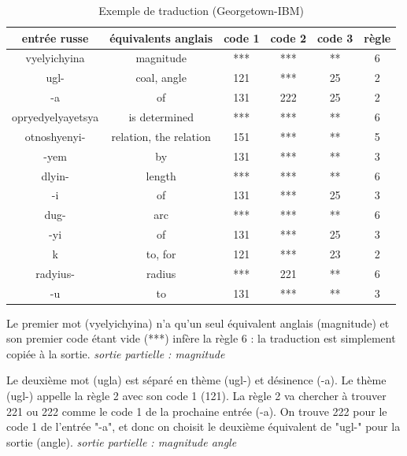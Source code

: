 \documentclass[11pt, a4paper]{report}
\begin{document}
\begin{table}[h] %
  \centering %
  \begin{tabular}{|c|c|c|c|c|c|} %
    \hline %
    entrée russe & équivalents anglais & code 1 & code 2 & code 3 & règle \\ %
    \hline
    vyelyichyina & magnitude & *** & *** & ** & 6 \\
    \hline
    ugl- & coal, angle & 121 & *** & 25 & 2 \\
    \hline 
    -a & of & 131 & 222 & 25 & 2 \\
    \hline 
    opryedyelyayetsya & is determined & *** & *** & ** & 6 \\
    \hline 
    otnoshyenyi- & relation, the relation & 151 & *** & ** & 5 \\ 
    \hline 
    -yem & by & 131 & *** & ** & 3 \\ 
    \hline 
    dlyin- & length & *** & *** & ** & 6 \\ 
    \hline 
    -i & of & 131 & *** & 25 & 3 \\ 
    \hline 
    dug- & arc & *** & *** & ** & 6 \\
    \hline 
    -yi & of & 131 & *** & 25 & 3 \\ 
    \hline 
    k & to, for & 121 & *** & 23 & 2 \\ 
    \hline 
    radyius- & radius & *** & 221 & ** & 6 \\ 
    \hline 
    -u & to & 131 & *** & ** & 3 \\
    \hline
  \end{tabular}
  \caption{Exemple de traduction (Georgetown-IBM)} %
  \label{tab:example} %
\end{table}

Le premier mot (vyelyichyina) n'a qu'un seul équivalent anglais (magnitude) et son 
premier code étant vide (***) infère la règle 6 : la traduction est simplement copiée 
à la sortie. \newline 
\textit{sortie partielle : magnitude} 

Le deuxième mot (ugla) est séparé en thème (ugl-) et désinence (-a). 
Le thème (ugl-) appelle la règle 2 avec son code 1 (121). La règle 2 va chercher à trouver 221 ou 222 
comme le code 1 de la prochaine entrée (-a). On trouve 222 pour le code 1 de l'entrée 
"-a", et donc on choisit le deuxième équivalent de "ugl-" pour la sortie (angle). \newline 
\textit{sortie partielle : magnitude angle}
\end{document}
